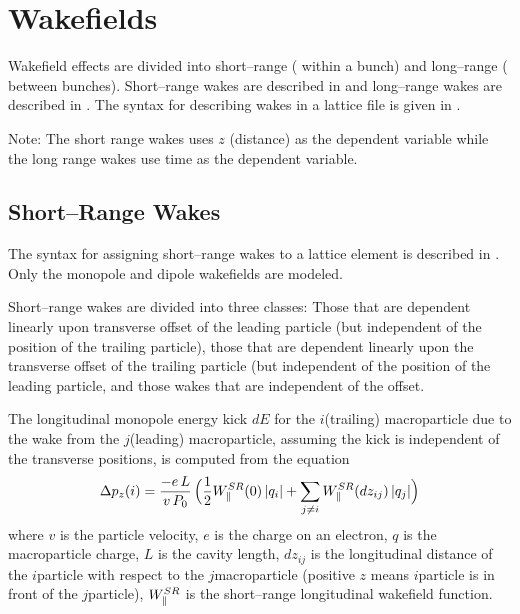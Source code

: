 \chapter{Wakefields}
\label{c:wakefields.eq}

Wakefield effects are divided into short--range ( within a bunch) and long--range
( between bunches). Short--range wakes are described in  and
long--range wakes are described in . The syntax for describing wakes in a lattice
file is given in .

Note: The short range wakes uses $z$ (distance) as the dependent variable while the long range wakes
use time as the dependent variable.

\section{Short--Range Wakes}
\label{s:sr.wake.eq}

The syntax for assigning short--range wakes to a lattice element is described in
. Only the monopole and dipole wakefields are modeled.

Short--range wakes are divided into three classes: Those that are dependent linearly upon transverse
offset of the leading particle (but independent of the position of the trailing particle), those
that are dependent linearly upon the transverse offset of the trailing particle (but independent of
the position of the leading particle, and those wakes that are independent of the offset.

The longitudinal monopole energy kick $dE$ for the $i$\Th (trailing) macroparticle due to the wake
from the $j$\Th (leading) macroparticle, assuming the kick is independent of the transverse
positions, is computed from the equation
\begin{equation}
  \Delta p_z(i) = \frac{-e \, L}{v \, P_0} \, \Bigl( \frac{1}{2}W^{SR}_\parallel(0) \,  |q_i| +
        \sum_{j \ne i} W^{SR}_\parallel(dz_{ij}) \, |q_j| \Bigr)
  \label{delvp1}
\end{equation}
where $v$ is the particle velocity, $e$ is the charge on an electron, $q$ is the macroparticle
charge, $L$ is the cavity length, $dz_{ij}$ is the longitudinal distance of the $i$\Th particle
with respect to the $j$\Th macroparticle (positive $z$ means $i$\Th particle is in front of the
$j$\Th particle), $W^{SR}_\parallel$ is the short--range longitudinal wakefield function.

